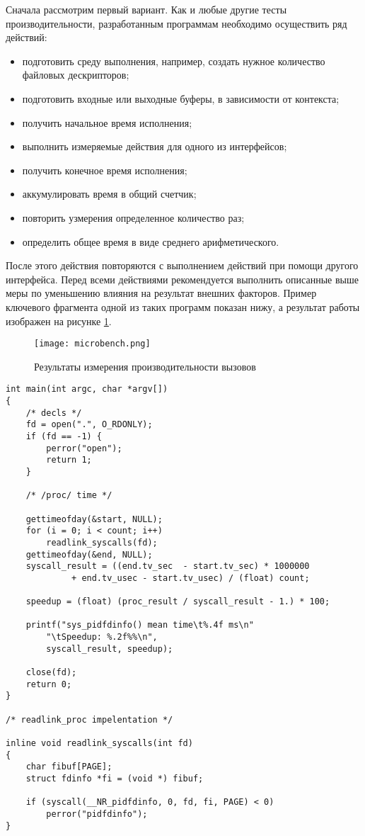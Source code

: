Сначала рассмотрим первый вариант. Как и любые другие тесты производительности,
разработанным программам необходимо осуществить ряд действий:
\begin{itemize}
\item подготовить среду выполнения, например, создать нужное количество файловых
  дескрипторов;
\item подготовить входные или выходные буферы, в зависимости от контекста;
\item получить начальное время исполнения;
\item выполнить измеряемые действия для одного из интерфейсов;
\item получить конечное время исполнения;
\item аккумулировать время в общий счетчик;
\item повторить узмерения определенное количество раз;
\item определить общее время в виде среднего арифметического.
\end{itemize}

После этого действия повторяются с выполнением действий при помощи другого
интерфейса. Перед всеми действиями рекомендуется выполнить описанные выше
меры по уменьшению влияния на результат внешних факторов. Пример ключевого
фрагмента одной из таких программ показан нижу, а результат работы изображен на
рисунке \ref{fig:microbench}.

\begin{figure}
  \centering
  \texttt{[image: microbench.png]}
  \caption{Результаты измерения производительности вызовов}
  \label{fig:microbench}
\end{figure}

\medskip
\begin{lstlisting}[style=cstyle]
int main(int argc, char *argv[])
{
	/* decls */
	fd = open(".", O_RDONLY);
	if (fd == -1) {
		perror("open");
		return 1;
	}

	/* /proc/ time */

	gettimeofday(&start, NULL);
	for (i = 0; i < count; i++)
		readlink_syscalls(fd);
	gettimeofday(&end, NULL);
	syscall_result = ((end.tv_sec  - start.tv_sec) * 1000000
			 + end.tv_usec - start.tv_usec) / (float) count;

	speedup = (float) (proc_result / syscall_result - 1.) * 100;

	printf("sys_pidfdinfo() mean time\t%.4f ms\n"
		"\tSpeedup: %.2f%%\n",
		syscall_result, speedup);

	close(fd);
	return 0;
}

/* readlink_proc impelentation */

inline void readlink_syscalls(int fd)
{
	char fibuf[PAGE];
	struct fdinfo *fi = (void *) fibuf;

	if (syscall(__NR_pidfdinfo, 0, fd, fi, PAGE) < 0)
		perror("pidfdinfo");
}
\end{lstlisting}
\medskip

